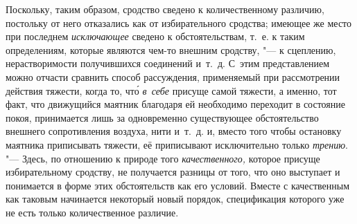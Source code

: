 Поскольку, таким образом, сродство сведено к количественному различию,
постольку от него отказались как от избирательного сродства; имеющее же место
при последнем {\em исключающее} сведено к обстоятельствам, т.~е. к таким
определениям, которые являются чем-то внешним сродству, "--- к сцеплению,
нерастворимости получившихся соединений и~т.~д. С~этим представлением можно
отчасти сравнить способ рассуждения, применяемый при рассмотрении действия
тяжести, когда то, чт\'{о} {\em в~себе} присуще самой тяжести, а именно, тот
факт, что движущийся маятник благодаря ей необходимо переходит в состояние
покоя, принимается лишь за одновременно существующее обстоятельство внешнего
сопротивления воздуха, нити и~т.~д. и, вместо того чтобы остановку маятника
приписывать тяжести, её приписывают исключительно только
{\em трению}. "--- Здесь, по отношению к природе того
{\em качественного,} которое присуще избирательному сродству, не получается
разницы от того, что оно выступает и понимается в форме этих обстоятельств как
его условий. Вместе с качественным как таковым начинается некоторый новый
порядок, спецификация которого уже не есть только количественное различие.


